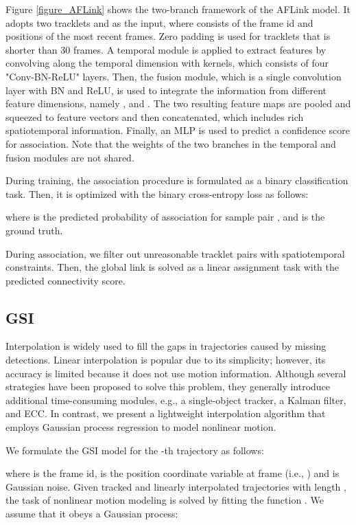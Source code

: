 \documentclass[lettersize,journal]{IEEEtran}
\begin{document}
Figure \ref{figure_AFLink} shows the two-branch framework of the AFLink model.
It adopts two tracklets  and  as the input, 
where  consists of the frame id  and positions  of the most recent  frames.
Zero padding is used for tracklets that is shorter than 30 frames.
A temporal module is applied to extract features by convolving along the temporal dimension with  kernels, which consists of four "Conv-BN-ReLU" layers.
Then, the fusion module, which is a single  convolution layer with BN and ReLU,
is used to integrate the information from different feature dimensions, namely ,  and .
The two resulting feature maps are pooled and squeezed to feature vectors and then concatenated, which includes rich spatiotemporal information.
Finally, an MLP is used to predict a confidence score for association.
Note that the weights of the two branches in the temporal and fusion modules are not shared.

During training, the association procedure is formulated as a binary classification task.
Then, it is optimized with the binary cross-entropy loss as follows:

where  is the predicted probability of association for sample pair , 
and  is the ground truth.

During association, we filter out unreasonable tracklet pairs with spatiotemporal constraints.
Then, the global link is solved as a linear assignment task \cite{kuhn1955hungarian} with the predicted connectivity score.

\subsection{GSI}

Interpolation is widely used to fill the gaps in trajectories caused by missing detections.
Linear interpolation is popular due to its simplicity;
however, its accuracy is limited because it does not use motion information.
Although several strategies have been proposed to solve this problem, 
they generally introduce additional time-consuming modules, e.g., a single-object tracker, a Kalman filter, and ECC.
In contrast, we present a lightweight interpolation algorithm that employs Gaussian process regression \cite{williams1995gaussian} to model nonlinear motion.

We formulate the GSI model for the -th trajectory as follows:

where  is the frame id,  is the position coordinate variable at frame  (i.e., ) and  is Gaussian noise. 
Given tracked and linearly interpolated trajectories  with length , 
the task of nonlinear motion modeling is solved by fitting the function .
We assume that it obeys a Gaussian process:
 
\end{document}
